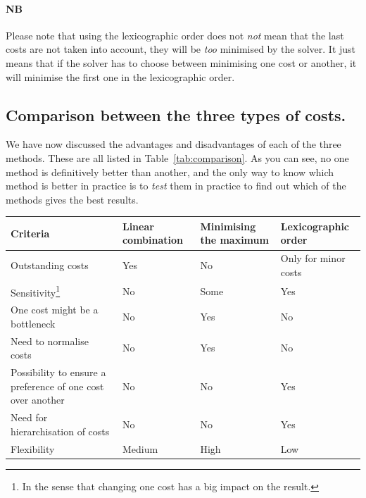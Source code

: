 \paragraph{NB} Please note that using the lexicographic order does not \textit{not} mean that the last costs are not taken into account, they will be \textit{too} minimised by the solver. It just means that if the solver has to choose between minimising one cost or another, it will minimise the first one in the lexicographic order. 

\subsection{Comparison between the three types of costs.}

We have now discussed the advantages and disadvantages of each of the three methods. These are all listed in Table~\ref{tab:comparison}. As you can see, no one method is definitively better than another, and the only way to know which method is better in practice is to \textit{test} them in practice to find out which of the methods gives the best results. 
\newpage
\begin{center}
    \centering
    \label{tab:comparison}
    \begin{tabularx}{\textwidth}{|>{\centering\arraybackslash}p{4cm}|>{\centering\arraybackslash}X|>{\centering\arraybackslash}X|>{\centering\arraybackslash}X|}
        \hline
        \textbf{Criteria} & \textbf{Linear combination} & \textbf{Minimising the maximum} & \textbf{Lexicographic order} \\
        \hline
        Outstanding costs & \cellcolor{red!25}Yes & \cellcolor{green!25}No & \cellcolor{orange!25}Only for minor costs \\
        \hline
        Sensitivity\footnote{In the sense that changing one cost has a big impact on the result.} & \cellcolor{red!25}No & \cellcolor{orange!25}Some & \cellcolor{green!25}Yes \\
        \hline
        One cost might be a bottleneck & \cellcolor{green!25}No & \cellcolor{red!25}Yes & \cellcolor{green!25}No \\
        \hline
        Need to normalise costs& \cellcolor{green!25}No & \cellcolor{red!25}Yes & \cellcolor{green!25}No \\
        \hline
        Possibility to ensure a preference of one cost over another  & \cellcolor{red!25}No & \cellcolor{red!25}No & \cellcolor{green!25}Yes \\
        \hline
        Need for hierarchisation of costs & \cellcolor{green!25}No & \cellcolor{green!25}No & \cellcolor{red!25}Yes \\
        \hline
        Flexibility & \cellcolor{orange!25}Medium & \cellcolor{green!25}High & \cellcolor{red!25}Low \\
        \hline

    \end{tabularx}
\end{center}

